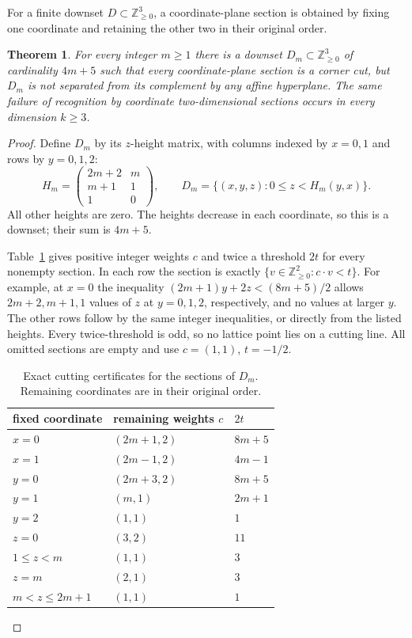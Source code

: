 \documentclass[11pt]{article}
\newtheorem{theorem}{Theorem}
\theoremstyle{remark}
\newcommand{\NN}{\mathbb Z_{\geq0}}
\begin{document}
For a finite downset $D\subset\NN^3$, a coordinate-plane section is obtained
by fixing one coordinate and retaining the other two in their original order.

\begin{theorem}\label{thm:slices}
For every integer $m\geq1$ there is a downset $D_m\subset\NN^3$ of
cardinality $4m+5$ such that every coordinate-plane section is a corner cut,
but $D_m$ is not separated from its complement by any affine hyperplane.
The same failure of recognition by coordinate two-dimensional sections occurs
in every dimension $k\geq3$.
\end{theorem}
\begin{proof}
Define $D_m$ by its $z$-height matrix, with columns indexed by $x=0,1$
and rows by $y=0,1,2$:
\[
 H_m=\begin{pmatrix}2m+2&m\\m+1&1\\1&0\end{pmatrix},\qquad
 D_m=\{(x,y,z):0\leq z<H_m(y,x)\}.
\]
All other heights are zero. The heights decrease in each coordinate, so this
is a downset; their sum is $4m+5$.

Table~\ref{tab:slices} gives positive integer weights $c$ and twice a threshold
$2t$ for every nonempty section. In each row the section is exactly
$\{v\in\NN^2:c\cdot v<t\}$. For example, at $x=0$ the inequality
$(2m+1)y+2z<(8m+5)/2$ allows $2m+2,m+1,1$ values of $z$ at
$y=0,1,2$, respectively, and no values at larger $y$.
The other rows follow by the same integer inequalities, or directly from
the listed heights. Every twice-threshold is odd, so no lattice point
lies on a cutting line. All omitted sections are empty and use $c=(1,1)$,
$t=-1/2$.

\begin{table}[ht]
\centering
\begin{tabular}{lll}
\toprule
fixed coordinate & remaining weights $c$ & $2t$\\
\midrule
$x=0$ & $(2m+1,2)$ & $8m+5$\\
$x=1$ & $(2m-1,2)$ & $4m-1$\\
$y=0$ & $(2m+3,2)$ & $8m+5$\\
$y=1$ & $(m,1)$ & $2m+1$\\
$y=2$ & $(1,1)$ & $1$\\
$z=0$ & $(3,2)$ & $11$\\
$1\leq z<m$ & $(1,1)$ & $3$\\
$z=m$ & $(2,1)$ & $3$\\
$m<z\leq2m+1$ & $(1,1)$ & $1$\\
\bottomrule
\end{tabular}
\caption{Exact cutting certificates for the sections of $D_m$.
Remaining coordinates are in their original order.}\label{tab:slices}
\end{table}


\end{proof}
\end{document}
